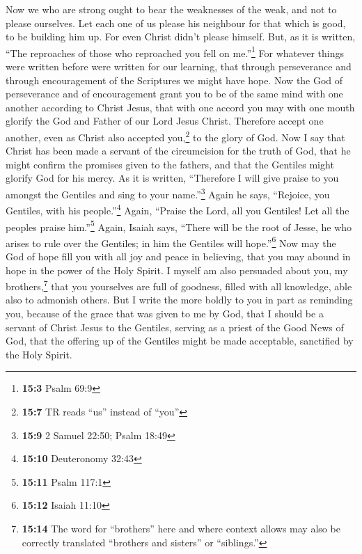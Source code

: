  Now we who are strong ought to bear the weaknesses of the
weak, and not to please ourselves.  Let each one of us
please his neighbour for that which is good, to be building him up.
 For even Christ didn't please himself. But, as it is
written, ``The reproaches of those who reproached you fell on
me.''\footnote{\textbf{15:3} Psalm 69:9}  For whatever
things were written before were written for our learning, that through
perseverance and through encouragement of the Scriptures we might have
hope.  Now the God of perseverance and of encouragement
grant you to be of the same mind with one another according to Christ
Jesus,  that with one accord you may with one mouth
glorify the God and Father of our Lord Jesus Christ. 
Therefore accept one another, even as Christ also accepted
you,\footnote{\textbf{15:7} TR reads ``us'' instead of ``you''} to the
glory of God.  Now I say that Christ has been made a
servant of the circumcision for the truth of God, that he might confirm
the promises given to the fathers,  and that the Gentiles
might glorify God for his mercy. As it is written, ``Therefore I will
give praise to you amongst the Gentiles and sing to your
name.''\footnote{\textbf{15:9} 2 Samuel 22:50; Psalm 18:49}
 Again he says, ``Rejoice, you Gentiles, with his
people.''\footnote{\textbf{15:10} Deuteronomy 32:43} 
Again, ``Praise the Lord, all you Gentiles! Let all the peoples praise
him.''\footnote{\textbf{15:11} Psalm 117:1}  Again,
Isaiah says, ``There will be the root of Jesse, he who arises to rule
over the Gentiles; in him the Gentiles will hope.''\footnote{\textbf{15:12}
  Isaiah 11:10}  Now may the God of hope fill you with
all joy and peace in believing, that you may abound in hope in the power
of the Holy Spirit.  I myself am also persuaded about
you, my brothers,\footnote{\textbf{15:14} The word for ``brothers'' here
  and where context allows may also be correctly translated ``brothers
  and sisters'' or ``siblings.''} that you yourselves are full of
goodness, filled with all knowledge, able also to admonish others.
 But I write the more boldly to you in part as reminding
you, because of the grace that was given to me by God, 
that I should be a servant of Christ Jesus to the Gentiles, serving as a
priest of the Good News of God, that the offering up of the Gentiles
might be made acceptable, sanctified by the Holy Spirit. 
